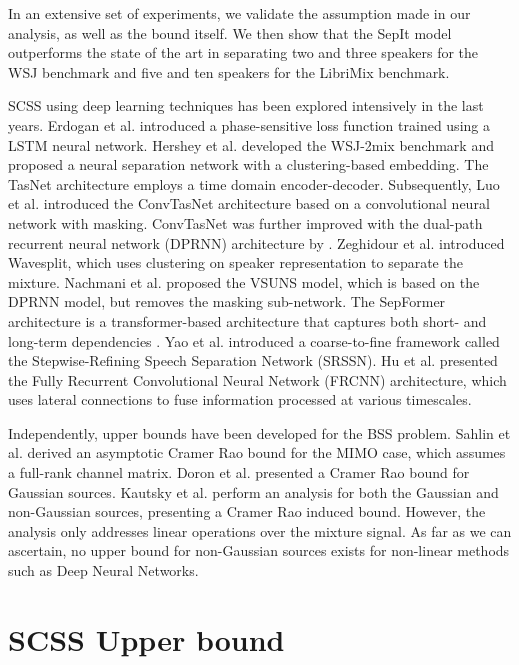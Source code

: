 \documentclass[a4paper]{article}
\theoremstyle{plain}
\theoremstyle{definition}
\theoremstyle{remark}
\begin{document}
In an extensive set of experiments, we validate the assumption made in our analysis, as well as the bound itself. We then show that the SepIt model outperforms the state of the art in separating two and three speakers for the WSJ \cite{garofolo1993csr} benchmark and five and ten speakers for the LibriMix \cite{cosentino2020librimix} benchmark.

\smallskip
{} SCSS using deep learning techniques has been explored intensively in the last years. Erdogan et al. \cite{7178061} introduced a phase-sensitive loss function trained using a LSTM neural network. Hershey et al. \cite{hershey2016deep} developed the WSJ-2mix benchmark and proposed a neural separation network with a clustering-based embedding. The TasNet architecture \cite{luo2018tasnet} employs a time domain encoder-decoder. Subsequently, Luo et al. \cite{luo2019conv}  introduced the ConvTasNet architecture based on a convolutional neural network with masking. ConvTasNet was further improved with the dual-path recurrent neural network (DPRNN) architecture by \cite{luo2019dual}. Zeghidour et al. \cite{zeghidour2020wavesplit} introduced Wavesplit, which uses clustering on speaker representation to separate the mixture. Nachmani et al. \cite{nachmani2020voice} proposed the VSUNS model, which is based on the DPRNN model, but removes the masking sub-network. The SepFormer architecture is a transformer-based architecture that captures both short- and long-term dependencies \cite{subakan2021attention}. Yao et al. \cite{yao2022stepwise} introduced a coarse-to-fine framework called the Stepwise-Refining Speech Separation Network (SRSSN). Hu et al. \cite{hu2021speech} presented the Fully Recurrent Convolutional Neural Network (FRCNN) architecture, which uses lateral connections to fuse information processed at various timescales. 

Independently, upper bounds have been developed for the BSS problem. Sahlin et al. \cite{534883} derived an asymptotic Cramer Rao bound for the MIMO case, which assumes a full-rank channel matrix. Doron et al. \cite{4202618} presented a Cramer Rao bound for Gaussian sources. Kautsky et al. \cite{2020} perform an analysis for both the Gaussian and non-Gaussian sources, presenting a Cramer Rao induced bound. However, the analysis only addresses linear operations over the mixture signal. As far as we can ascertain, no upper bound for non-Gaussian sources exists for non-linear methods such as Deep Neural Networks.

\section{SCSS Upper bound}
\label{sec:upper_bound}
\end{document}
